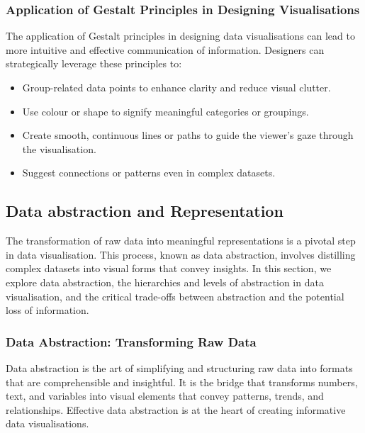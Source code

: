 \documentclass{article}\usepackage[]{graphicx}\usepackage[]{xcolor}
\begin{document}
\subsubsection{Application of Gestalt Principles in Designing Visualisations}
The application of Gestalt principles in designing data visualisations can lead to more intuitive and effective communication of information. Designers can strategically leverage these principles to:
\begin{itemize}
    \item Group-related data points to enhance clarity and reduce visual clutter.
    \item Use colour or shape to signify meaningful categories or groupings.
    \item Create smooth, continuous lines or paths to guide the viewer's gaze through the visualisation.
    \item Suggest connections or patterns even in complex datasets.
\end{itemize}

\subsection{Data abstraction and Representation}
The transformation of raw data into meaningful representations is a pivotal step in data visualisation. This process, known as data abstraction, involves distilling complex datasets into visual forms that convey insights. In this section, we explore data abstraction, the hierarchies and levels of abstraction in data visualisation, and the critical trade-offs between abstraction and the potential loss of information.

\subsubsection{Data Abstraction: Transforming Raw Data}
Data abstraction is the art of simplifying and structuring raw data into formats that are comprehensible and insightful. It is the bridge that transforms numbers, text, and variables into visual elements that convey patterns, trends, and relationships. Effective data abstraction is at the heart of creating informative data visualisations.
\end{document}
